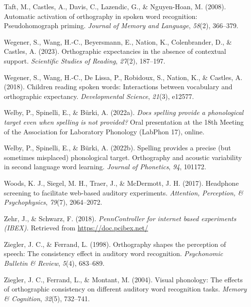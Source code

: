 \documentclass[
  english,
  man,floatsintext]{apa7}
\newlength{\cslhangindent}
\newenvironment{CSLReferences}[2] %
 {\begin{list}{}{%
  \setlength{\itemindent}{0pt}
  \setlength{\leftmargin}{0pt}
  \setlength{\parsep}{0pt}
  \ifodd #1
   \setlength{\leftmargin}{\cslhangindent}
   \setlength{\itemindent}{-1\cslhangindent}
  \fi
  \setlength{\itemsep}{#2\baselineskip}}}
 {\end{list}}
\begin{document}
\begin{CSLReferences}{1}{0}
Taft, M., Castles, A., Davis, C., Lazendic, G., \& Nguyen-Hoan, M. (2008). Automatic activation of orthography in spoken word recognition: Pseudohomograph priming. \emph{Journal of Memory and Language}, \emph{58}(2), 366--379.

Wegener, S., Wang, H.-C., Beyersmann, E., Nation, K., Colenbrander, D., \& Castles, A. (2023). Orthographic expectancies in the absence of contextual support. \emph{Scientific Studies of Reading}, \emph{27}(2), 187--197.

Wegener, S., Wang, H.-C., De Lissa, P., Robidoux, S., Nation, K., \& Castles, A. (2018). Children reading spoken words: Interactions between vocabulary and orthographic expectancy. \emph{Developmental Science}, \emph{21}(3), e12577.

Welby, P., Spinelli, E., \& Bürki, A. (2022a). \emph{Does spelling provide a phonological target even when spelling is not provided?} Oral presentation at the 18th Meeting of the Association for Laboratory Phonology (LabPhon 17), online.

Welby, P., Spinelli, E., \& Bürki, A. (2022b). Spelling provides a precise (but sometimes misplaced) phonological target. Orthography and acoustic variability in second language word learning. \emph{Journal of Phonetics}, \emph{94}, 101172.

Woods, K. J., Siegel, M. H., Traer, J., \& McDermott, J. H. (2017). Headphone screening to facilitate web-based auditory experiments. \emph{Attention, Perception, \& Psychophysics}, \emph{79}(7), 2064--2072.

Zehr, J., \& Schwarz, F. (2018). \emph{PennController for internet based experiments (IBEX).} Retrieved from \url{https://doc.pcibex.net/}

Ziegler, J. C., \& Ferrand, L. (1998). Orthography shapes the perception of speech: The consistency effect in auditory word recognition. \emph{Psychonomic Bulletin \& Review}, \emph{5}(4), 683--689.

Ziegler, J. C., Ferrand, L., \& Montant, M. (2004). Visual phonology: The effects of orthographic consistency on different auditory word recognition tasks. \emph{Memory \& Cognition}, \emph{32}(5), 732--741.

\end{CSLReferences}
\end{document}
